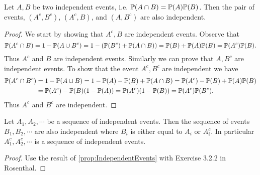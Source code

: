 \begin{proposition}
	\label{prop:IndependentEvents}
	Let $ A,B $ be two independent events, i.e. $ \mathbb{P}(A\cap B) = \mathbb{P}(A) \mathbb{P}(B) $. Then the pair of events, $ (A^c, B^c) $, $ (A^c,B) $, and $ (A,B^c) $ are also independent.
\end{proposition}
\begin{proof}
	We start by showing that $ A^c, B $ are independent events. Observe that
	\[ \mathbb{P}(A^c\cap B) = 1 - \mathbb{P}(A\cup B^c) = 1 - (\mathbb{P}(B^c)+\mathbb{P}(A\cap B)) = \mathbb{P}(B) + \mathbb{P}(A)\mathbb{P}(B) = \mathbb{P}(A^c) \mathbb{P}(B). \]
	Thus $ A^c $ and $ B $ are independent events. Similarly we can prove that $ A,B^c $ are independent events. To show that the event $ A^c, B^c $ are independent we have
	\begin{align*}
		\mathbb{P}(A^c\cap B^c) &= 1 - \mathbb{P}(A\cup B) = 1 - \mathbb{P}(A) - \mathbb{P}(B) + \mathbb{P}(A\cap B) = \mathbb{P}(A^c) - \mathbb{P}(B) + \mathbb{P}(A)\mathbb{P}(B) \\
		&= \mathbb{P}(A^c)-\mathbb{P}(B)(1-\mathbb{P}(A)) = \mathbb{P}(A^c)(1-\mathbb{P}(B)) = \mathbb{P}(A^c)\mathbb{P}(B^c). 
	\end{align*}
	Thus $ A^c $ and $ B^c $ are independent.
\end{proof}

\begin{proposition}
	\label{prop:SeqIndependentEvents}
	Let $ A_1,A_2,\cdots $ be a sequence of independent events. Then the sequence of events $ B_1,B_2,\cdots $ are also independent where $ B_i $ is either equal to $ A_i $ or $ A_i^c $. In particular $ A_1^c, A_2^c,\cdots $ is a sequence of independent events.
\end{proposition}
\begin{proof}
 	Use the result of \autoref{prop:IndependentEvents} with Exercise 3.2.2 in Rosenthal.
\end{proof}
 
 
